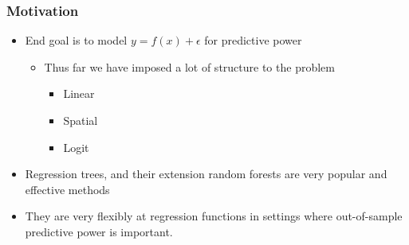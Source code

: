 \documentclass[
  shownotes,
  xcolor={svgnames},
  hyperref={colorlinks,citecolor=DarkBlue,linkcolor=DarkRed,urlcolor=DarkBlue}
  , aspectratio=169]{beamer}
\begin{document}
\begin{frame}[fragile]
\frametitle{Motivation}


\begin{itemize}
  \item End goal is to model $y=f(x)+\epsilon$ for predictive power
  \begin{itemize}
    \item Thus far we have imposed a lot of structure to the problem
    \begin{itemize}
      \item Linear
      \item Spatial
      \item Logit
    \end{itemize}

\medskip
  \end{itemize}
  \item Regression trees, and their extension random forests are very popular and effective methods 
  \item They are very flexibly at regression functions in settings where out-of-sample predictive power is important.
\end{itemize}


\end{frame}
\end{document}
